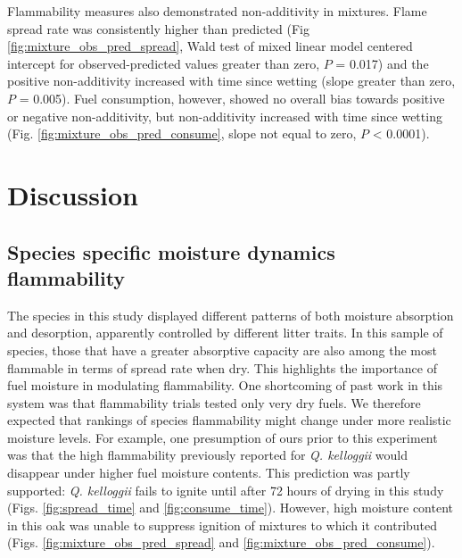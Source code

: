 \documentclass[fire,article,submit,moreauthors,pdftex]{Definitions/mdpi}
\begin{document}
Flammability measures also demonstrated non-additivity in mixtures. Flame spread rate was consistently higher than predicted (Fig \ref{fig:mixture_obs_pred_spread}, Wald test of mixed linear model centered intercept for observed-predicted values greater than zero, $P$ = 0.017) and the positive non-additivity increased with time since wetting (slope greater than zero, $P$ = 0.005). Fuel consumption, however, showed no overall bias towards positive or negative non-additivity, but non-additivity increased with time since wetting (Fig. \ref{fig:mixture_obs_pred_consume}, slope not equal to zero, $P$ < 0.0001).

\section{Discussion}

\subsection{Species specific moisture dynamics flammability}

The species in this study displayed different patterns of both moisture absorption and desorption, apparently controlled by different litter traits. In this sample of species, those that have a greater absorptive capacity are also among the most flammable in terms of spread rate when dry.  This highlights the importance of fuel moisture in modulating flammability. One shortcoming of past work in this system \cite{Magalhaes+Schwilk-2012} was that flammability trials tested only very dry fuels. We therefore expected that rankings of species flammability might change under more realistic moisture levels. For example, one presumption of ours prior to this experiment was that the high flammability previously reported for \emph{Q. kelloggii} \cite{Magalhaes+Schwilk-2012} would disappear under higher fuel moisture contents. This prediction was partly supported: \emph{Q. kelloggii} fails to ignite until after 72 hours of drying in this study (Figs. \ref{fig:spread_time} and \ref{fig:consume_time}). However, high moisture content in this oak was unable to suppress ignition of mixtures to which it contributed (Figs. \ref{fig:mixture_obs_pred_spread} and \ref{fig:mixture_obs_pred_consume}). 
\end{document}
